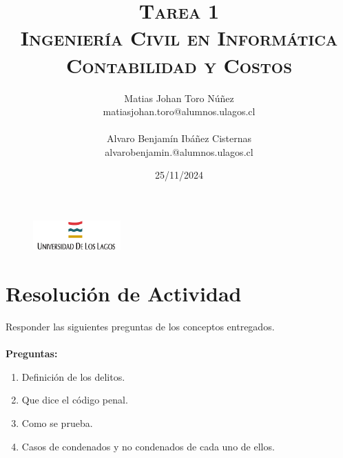 \documentclass[letter,12pt]{article}
\begin{document}
	\begin{figure}
		\includegraphics[width=0.3\textwidth, left]{figures/download.png}
	\end{figure}
	\setlength{\unitlength}{1 cm} 
	\title{\scshape\Huge{Tarea 1}\\\vspace{3cm}
		\Large Ingeniería Civil en Informática\\\vspace{1cm}
		\Large Contabilidad y Costos\\\vspace{2cm}}
	
	\author{
		Matias Johan Toro Núñez\\
		matiasjohan.toro@alumnos.ulagos.cl\\\\
		Alvaro Benjamín Ibáñez Cisternas\\
		alvarobenjamin.@alumnos.ulagos.cl
	\vspace{3cm}}
	
	\date{25/11/2024}
	\maketitle
	\thispagestyle{empty}
	\clearpage
	\setcounter{page}{1}
	
	\tableofcontents
	\newpage
	
	
	\section{Resolución de Actividad}
	Responder las siguientes preguntas de los conceptos entregados.\\\\
	\textbf{Preguntas:}
	\begin{enumerate}
		\item Definición de los delitos.\\
		\item Que dice el código penal.\\
		\item Como se prueba.\\
		\item Casos de condenados y no condenados de cada uno de ellos.\\\\
	\end{enumerate}
	
\end{document}
